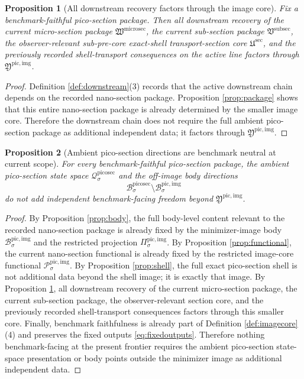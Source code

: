 \documentclass[11pt]{article}
\newcommand{\SubSectionPackage}{\mathfrak V^{\mathrm{subsec}}}
\newcommand{\MicroSectionPackage}{\mathfrak W^{\mathrm{microsec}}}
\newcommand{\SubPreSectionCore}{\mathfrak U^{\mathrm{sec}}}
\newcommand{\PicoSectionSpace}[1]{\mathcal Q_{#1}^{\mathrm{picosec}}}
\newcommand{\PicoSectionBody}[1]{\mathcal B_{#1}^{\mathrm{picosec}}}
\newcommand{\PicoImageCore}{\mathfrak Y^{\mathrm{pic,img}}}
\newcommand{\PicoImgBody}[1]{\mathcal B_{#1}^{\mathrm{pic,img}}}
\newcommand{\PicoImgProj}[1]{\Pi_{#1}^{\mathrm{pic,img}}}
\newcommand{\PicoImgFunctional}[1]{\mathscr P_{#1}^{\mathrm{pic,img}}}
\newtheorem{proposition}{Proposition}
\begin{document}
\begin{proposition}[All downstream recovery factors through the image core]
\label{prop:downstream}
Fix a benchmark-faithful pico-section package. Then all downstream recovery of the current micro-section package \(\MicroSectionPackage\), the current sub-section package \(\SubSectionPackage\), the observer-relevant sub-pre-core exact-shell transport-section core \(\SubPreSectionCore\), and the previously recorded shell-transport consequences on the active line factors through \(\PicoImageCore\).
\end{proposition}

\begin{proof}
Definition \ref{def:downstream}(3) records that the active downstream chain depends on the recorded nano-section package. Proposition \ref{prop:package} shows that this entire nano-section package is already determined by the smaller image core. Therefore the downstream chain does not require the full ambient pico-section package as additional independent data; it factors through \(\PicoImageCore\).
\end{proof}

\begin{proposition}[Ambient pico-section directions are benchmark neutral at current scope]
\label{prop:neutral}
For every benchmark-faithful pico-section package, the ambient pico-section state space \(\PicoSectionSpace{\sigma}\) and the off-image body directions
\[
\PicoSectionBody{\sigma}\setminus\PicoImgBody{\sigma}
\]
do not add independent benchmark-facing freedom beyond \(\PicoImageCore\).
\end{proposition}

\begin{proof}
By Proposition \ref{prop:body}, the full body-level content relevant to the recorded nano-section package is already fixed by the minimizer-image body \(\PicoImgBody{\sigma}\) and the restricted projection \(\PicoImgProj{\sigma}\). By Proposition \ref{prop:functional}, the current nano-section functional is already fixed by the restricted image-core functional \(\PicoImgFunctional{\sigma}\). By Proposition \ref{prop:shell}, the full exact pico-section shell is not additional data beyond the shell image; it is exactly that image. By Proposition \ref{prop:downstream}, all downstream recovery of the current micro-section package, the current sub-section package, the observer-relevant section core, and the previously recorded shell-transport consequences factors through this smaller core. Finally, benchmark faithfulness is already part of Definition \ref{def:imagecore}(4) and preserves the fixed outputs \eqref{eq:fixedoutputs}. Therefore nothing benchmark-facing at the present frontier requires the ambient pico-section state-space presentation or body points outside the minimizer image as additional independent data.
\end{proof}
\end{document}
